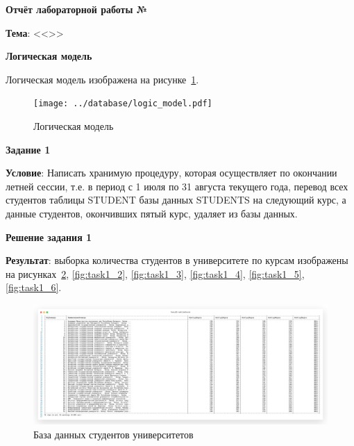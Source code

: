 \begin{center}
  \textbf{Отчёт лабораторной работы №\envReportLabNumber}
\end{center}

\textbf{Тема}:
<<\envReportTitle>>

\begin{center}
  \textbf{Логическая модель}
\end{center}

Логическая модель изображена на рисунке~\ref{fig:logic_model}.

\begin{figure}[!h]
  \centering

  \texttt{[image: ../database/logic\_model.pdf]}

  \caption{Логическая модель}

  \label{fig:logic_model}
\end{figure}

\newpage

\begin{center}
  \textbf{Задание 1}
\end{center}

\textbf{Условие}:
Написать хранимую процедуру, которая осуществляет по окончании летней сессии, т.е. в период с 1 июля по 31 августа текущего года,
перевод всех студентов таблицы STUDENT базы данных STUDENTS на следующий курс,
а данные студентов, окончивших пятый курс, удаляет из базы данных.

\begin{center}
  \textbf{Решение задания 1}
\end{center}



\textbf{Результат}: выборка количества студентов в университете по курсам изображены на рисунках~\ref{fig:task1_1},
\ref{fig:task1_2}, \ref{fig:task1_3}, \ref{fig:task1_4}, \ref{fig:task1_5}, \ref{fig:task1_6}.

\begin{figure}[!h]
  \centering

  \includegraphics[width=18cm]
  {../sql/task1/task1_before.png}

  \caption{База данных студентов университетов}

  \label{fig:task1_1}
\end{figure}

